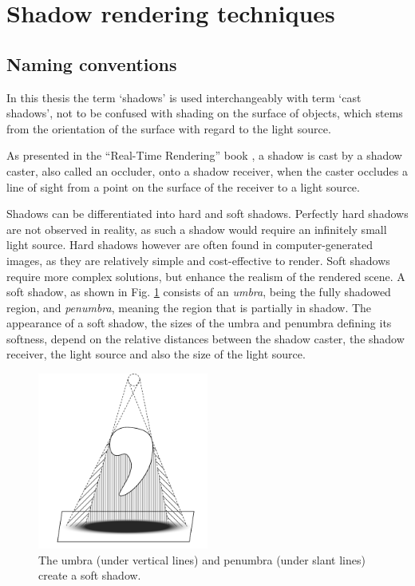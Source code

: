 \section{Shadow rendering techniques}

\subsection{Naming conventions}

In this thesis the term `shadows' is used interchangeably with term `cast shadows', not to be confused with shading on the surface of objects, which stems from the orientation of the surface with regard to the light source.

As presented in the ``Real-Time Rendering'' book \cite{bib:book:real_time_rendering}, a shadow is cast by a shadow caster, also called an occluder, onto a shadow receiver, when the caster occludes a line of sight from a point on the surface of the receiver to a light source.

Shadows can be differentiated into hard and soft shadows. Perfectly hard shadows are not observed in reality, as such a shadow would require an infinitely small light source. Hard shadows however are often found in computer-generated images, as they are relatively simple and cost-effective to render. Soft shadows require more complex solutions, but enhance the realism of the rendered scene. A soft shadow, as shown in Fig. \ref{fig:shadow_soft} consists of an \textit{umbra}, being the fully shadowed region, and \textit{penumbra}, meaning the region that is partially in shadow. The appearance of a soft shadow, the sizes of the umbra and penumbra defining its softness, depend on the relative distances between the shadow caster, the shadow receiver, the light source and also the size of the light source.

\begin{figure}
    \centering
    \includegraphics[width=0.5\textwidth]{./graf/shadow_example_soft.pdf}
    \caption{The umbra (under vertical lines) and penumbra (under slant lines) create a soft shadow.}
    \label{fig:shadow_soft}
\end{figure}

